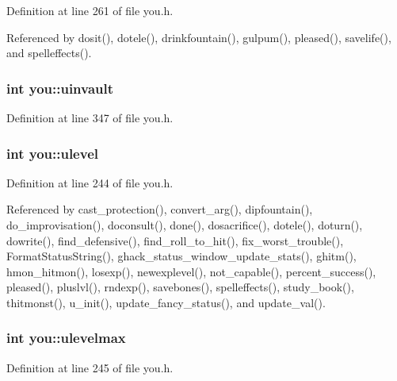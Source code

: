 Definition at line 261 of file you.\+h.



Referenced by dosit(), dotele(), drinkfountain(), gulpum(), pleased(), savelife(), and spelleffects().

\hypertarget{structyou_a3ec671b2cb8346e23eea84a63336597c}{
\subsubsection[{uinvault}]{\setlength{\rightskip}{0pt plus 5cm}int you\+::uinvault}}\label{structyou_a3ec671b2cb8346e23eea84a63336597c}


Definition at line 347 of file you.\+h.

\hypertarget{structyou_a6c7263bb25b91825bf7ecaab470d771a}{
\subsubsection[{ulevel}]{\setlength{\rightskip}{0pt plus 5cm}int you\+::ulevel}}\label{structyou_a6c7263bb25b91825bf7ecaab470d771a}


Definition at line 244 of file you.\+h.



Referenced by cast\+\_\+protection(), convert\+\_\+arg(), dipfountain(), do\+\_\+improvisation(), doconsult(), done(), dosacrifice(), dotele(), doturn(), dowrite(), find\+\_\+defensive(), find\+\_\+roll\+\_\+to\+\_\+hit(), fix\+\_\+worst\+\_\+trouble(), Format\+Status\+String(), ghack\+\_\+status\+\_\+window\+\_\+update\+\_\+stats(), ghitm(), hmon\+\_\+hitmon(), losexp(), newexplevel(), not\+\_\+capable(), percent\+\_\+success(), pleased(), pluslvl(), rndexp(), savebones(), spelleffects(), study\+\_\+book(), thitmonst(), u\+\_\+init(), update\+\_\+fancy\+\_\+status(), and update\+\_\+val().

\hypertarget{structyou_a4ef7d6892966c8f8250e2d675bc1de05}{
\subsubsection[{ulevelmax}]{\setlength{\rightskip}{0pt plus 5cm}int you\+::ulevelmax}}\label{structyou_a4ef7d6892966c8f8250e2d675bc1de05}


Definition at line 245 of file you.\+h.




